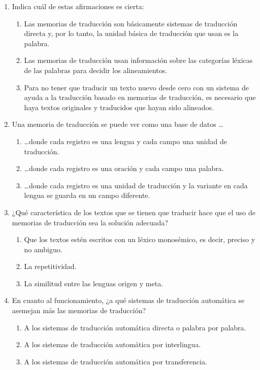 \begin{enumerate} 

\item Indica cuál de estas afirmaciones es cierta: \begin{enumerate} \item Las memorias de traducción son básicamente sistemas de traducción directa y, por lo tanto, la unidad básica de traducción que usan es la palabra. \item Las memorias de traducción usan información sobre las categorías léxicas de las palabras para decidir los alineamientos. \item Para no tener que traducir un texto nuevo desde cero con un sistema de ayuda a la traducción basado en memorias de traducción, es necesario que haya textos originales y traducidos que hayan sido alineados. \end{enumerate} 

\item Una memoria de traducción se puede ver como una base de datos \ldots

\begin{enumerate} \item \ldots donde cada registro es una lengua y cada campo una unidad de traducción. \item \ldots donde cada registro es una oración y cada campo una palabra. \item \ldots donde cada registro es una unidad de traducción y la variante en cada lengua se guarda en un campo diferente. \end{enumerate} 

\item ¿Qué característica de los textos que se tienen que traducir hace que el uso de memorias de traducción sea la solución adecuada? \begin{enumerate} \item Que los textos estén escritos con un léxico monosémico, es decir, preciso y no ambiguo. \item La repetitividad. \item La similitud entre las lenguas origen y meta. \end{enumerate} 

\item En cuanto al funcionamiento, ¿a qué sistemas de traducción automática se asemejan más las memorias de traducción? \begin{enumerate} \item A los sistemas de traducción automática directa o palabra por palabra. \item A los sistemas de traducción automática por interlingua. \item A los sistemas de traducción automática por transferencia. \end{enumerate} 


\end{enumerate}
